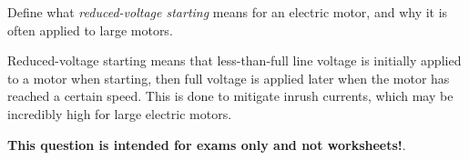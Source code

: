 

Define what {\it reduced-voltage starting} means for an electric motor, and why it is often applied to large motors.







Reduced-voltage starting means that less-than-full line voltage is initially applied to a motor when starting, then full voltage is applied later when the motor has reached a certain speed.  This is done to mitigate inrush currents, which may be incredibly high for large electric motors.







{\bf This question is intended for exams only and not worksheets!}.




